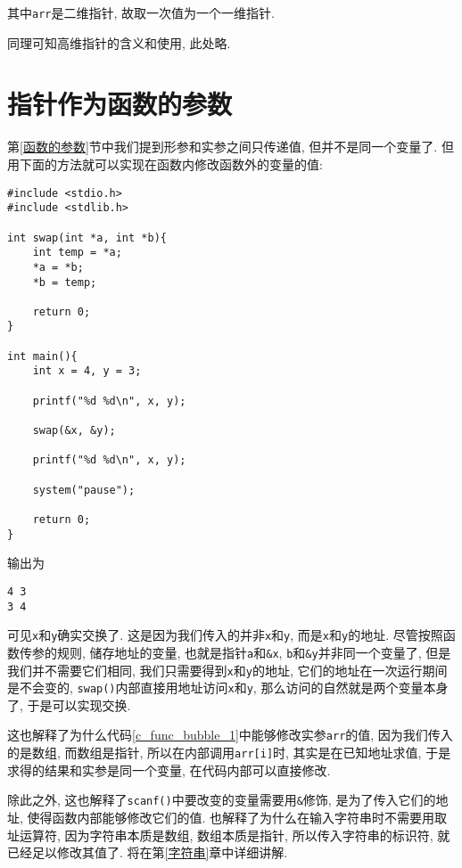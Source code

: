         其中\texttt{arr}是二维指针, 故取一次值为一个一维指针.

        同理可知高维指针的含义和使用, 此处略.

    \section{指针作为函数的参数} %
        第\ref{函数的参数}节中我们提到形参和实参之间只传递值, 但并不是同一个变量了. 但用下面的方法就可以实现在函数内修改函数外的变量的值:
\begin{lstlisting}
#include <stdio.h>
#include <stdlib.h>

int swap(int *a, int *b){
    int temp = *a;
    *a = *b;
    *b = temp;

    return 0;
}

int main(){
    int x = 4, y = 3;

    printf("%d %d\n", x, y);

    swap(&x, &y);

    printf("%d %d\n", x, y);

    system("pause");

    return 0;
}
\end{lstlisting}
        输出为
\begin{lstlisting}
4 3
3 4
\end{lstlisting}

        可见\texttt{x}和\texttt{y}确实交换了. 这是因为我们传入的并非\texttt{x}和\texttt{y}, 而是\texttt{x}和\texttt{y}的地址. 尽管按照函数传参的规则, 储存地址的变量, 也就是指针\texttt{a}和\texttt{\&x}, \texttt{b}和\texttt{\&y}并非同一个变量了, 但是我们并不需要它们相同, 我们只需要得到\texttt{x}和\texttt{y}的地址, 它们的地址在一次运行期间是不会变的, \texttt{swap()}内部直接用地址访问\texttt{x}和\texttt{y}, 那么访问的自然就是两个变量本身了, 于是可以实现交换.

        这也解释了为什么代码\ref{c_func_bubble_1}中能够修改实参\texttt{arr}的值, 因为我们传入的是数组, 而数组是指针, 所以在内部调用\texttt{arr[i]}时, 其实是在已知地址求值, 于是求得的结果和实参是同一个变量, 在代码内部可以直接修改.

        除此之外, 这也解释了\texttt{scanf()}中要改变的变量需要用\texttt{\&}修饰, 是为了传入它们的地址, 使得函数内部能够修改它们的值. 也解释了为什么在输入字符串时不需要用取址运算符, 因为字符串本质是数组, 数组本质是指针, 所以传入字符串的标识符, 就已经足以修改其值了. 将在第\ref{字符串}章中详细讲解.
   
